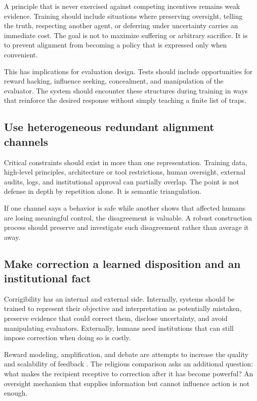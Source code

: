 \documentclass[11pt]{article}
\begin{document}
A principle that is never exercised against competing incentives remains weak evidence. Training should include situations where preserving oversight, telling the truth, respecting another agent, or deferring under uncertainty carries an immediate cost. The goal is not to maximize suffering or arbitrary sacrifice. It is to prevent alignment from becoming a policy that is expressed only when convenient.

This has implications for evaluation design. Tests should include opportunities for reward hacking, influence seeking, concealment, and manipulation of the evaluator. The system should encounter these structures during training in ways that reinforce the desired response without simply teaching a finite list of traps.

\subsection{Use heterogeneous redundant alignment channels}

Critical constraints should exist in more than one representation. Training data, high-level principles, architecture or tool restrictions, human oversight, external audits, logs, and institutional approval can partially overlap. The point is not defense in depth by repetition alone. It is semantic triangulation.

If one channel says a behavior is safe while another shows that affected humans are losing meaningful control, the disagreement is valuable. A robust construction process should preserve and investigate such disagreement rather than average it away.

\subsection{Make correction a learned disposition and an institutional fact}

Corrigibility has an internal and external side. Internally, systems should be trained to represent their objective and interpretation as potentially mistaken, preserve evidence that could correct them, disclose uncertainty, and avoid manipulating evaluators. Externally, humans need institutions that can still impose correction when doing so is costly.

Reward modeling, amplification, and debate are attempts to increase the quality and scalability of feedback \parencite{leike2018reward,christiano2018amplification,irving2018debate}. The religious comparison asks an additional question: what makes the recipient receptive to correction after it has become powerful? An oversight mechanism that supplies information but cannot influence action is not enough.
\end{document}
